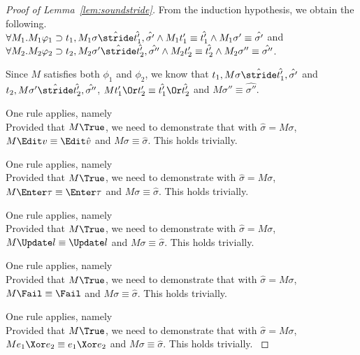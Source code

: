 \begin{proof}[Proof of Lemma~\ref{lem:soundstride}]
{{    From the induction hypothesis, we obtain the following.\\
    $\forall M_1 . M_1 \phi_1 \implies t_1,M_1\sigma \hat{\stride} \hat{t_1'},\hat{\sigma'}\land M_1 t_1'\equiv\hat{t_1'}\land M_1\sigma' \equiv \hat{\sigma'}$ and\\
    $\forall M_2 . M_2 \phi_2 \implies t_2,M_2\sigma' \hat{\stride} \hat{t_2'},\hat{\sigma''}\land M_2 t_2'\equiv\hat{t_2'}\land M_2\sigma'' \equiv \hat{\sigma''}$.

    Since $M$ satisfies both $\phi_1$ and $\phi_2$,
    we know that $t_1,M\sigma \hat{\stride} \hat{t_1'},\hat{\sigma'}$ and $t_2,M\sigma'\hat{\stride}\hat{t_2'},\hat{\sigma''}$,
    $M t_1'\Or t_2'\equiv \hat{t_1'}\Or\hat{t_2'}$ and $M\sigma''\equiv \hat{\sigma''}$.

    }
  }

  {One rule applies, namely \\
  Provided that $M\True$, we need to demonstrate that  with $\hat{\sigma}=M\sigma$,
  $M\Edit v \equiv \Edit \hat{v}$ and $M\sigma \equiv \hat{\sigma}$.
  This holds trivially.

  }

  {One rule applies, namely \\
  Provided that $M\True$, we need to demonstrate  with $\hat{\sigma}=M\sigma$,
  $M\Enter \tau \equiv \Enter \tau$ and $M\sigma \equiv \hat{\sigma}$.
  This holds trivially.
  }

  {One rule applies, namely \\
  Provided that $M\True$, we need to demonstrate  with $\hat{\sigma}=M\sigma$,
  $M\Update l \equiv \Update l$ and $M\sigma \equiv \hat{\sigma}$.
  This holds trivially.
  }

  {One rule applies, namely \\
  Provided that $M\True$, we need to demonstrate that  with $\hat{\sigma}=M\sigma$,
  $M\Fail \equiv \Fail$ and $M\sigma \equiv \hat{\sigma}$.
  This holds trivially.
  }

  {One rule applies, namely \\
  Provided that $M\True$, we need to demonstrate that  with $\hat{\sigma}=M\sigma$,
  $M e_1\Xor e_2 \equiv e_1\Xor e_2$ and $M\sigma \equiv \hat{\sigma}$.
  This holds trivially.
  }


\end{proof}
